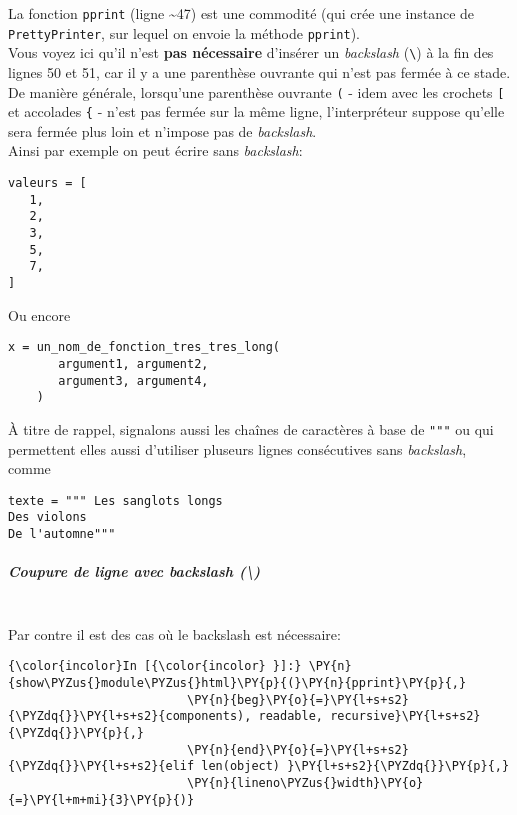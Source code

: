     La fonction \texttt{pprint} (ligne \textasciitilde{}47) est une
commodité (qui crée une instance de \texttt{PrettyPrinter}, sur lequel
on envoie la méthode \texttt{pprint}).\\

Vous voyez ici qu'il n'est \textbf{pas nécessaire} d'insérer un
\emph{backslash} (\texttt{\textbackslash{}}) à la fin des lignes 50 et
51, car il y a une parenthèse ouvrante qui n'est pas fermée à ce stade.\\

De manière générale, lorsqu'une parenthèse ouvrante \texttt{(} - idem
avec les crochets \texttt{{[}} et accolades \texttt{\{} - n'est pas
fermée sur la même ligne, l'interpréteur suppose qu'elle sera fermée
plus loin et n'impose pas de \emph{backslash}.\\

    Ainsi par exemple on peut écrire sans \emph{backslash}:

\begin{verbatim}
valeurs = [ 
   1,
   2,
   3,
   5,
   7,
]
\end{verbatim}

Ou encore

\begin{verbatim}
x = un_nom_de_fonction_tres_tres_long(
       argument1, argument2,
       argument3, argument4,
    )        
\end{verbatim}

    À titre de rappel, signalons aussi les chaînes de caractères à base de
\texttt{"""} ou
\texttt{\textquotesingle{}\textquotesingle{}\textquotesingle{}} qui
permettent elles aussi d'utiliser pluseurs lignes consécutives sans
\emph{backslash}, comme

\begin{verbatim}
texte = """ Les sanglots longs
Des violons
De l'automne"""
\end{verbatim}

    \hypertarget{coupure-de-ligne-avec-backslash}{%
\subparagraph{\texorpdfstring{Coupure de ligne avec \emph{backslash}
(\textbackslash{})}{Coupure de ligne avec backslash (\textbackslash{})}\\\\}\label{coupure-de-ligne-avec-backslash}}

    Par contre il est des cas où le backslash est nécessaire:

    \begin{Verbatim}[commandchars=\\\{\}]
{\color{incolor}In [{\color{incolor} }]:} \PY{n}{show\PYZus{}module\PYZus{}html}\PY{p}{(}\PY{n}{pprint}\PY{p}{,} 
                         \PY{n}{beg}\PY{o}{=}\PY{l+s+s2}{\PYZdq{}}\PY{l+s+s2}{components), readable, recursive}\PY{l+s+s2}{\PYZdq{}}\PY{p}{,} 
                         \PY{n}{end}\PY{o}{=}\PY{l+s+s2}{\PYZdq{}}\PY{l+s+s2}{elif len(object) }\PY{l+s+s2}{\PYZdq{}}\PY{p}{,} 
                         \PY{n}{lineno\PYZus{}width}\PY{o}{=}\PY{l+m+mi}{3}\PY{p}{)}
\end{Verbatim}


